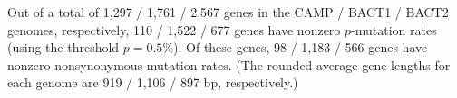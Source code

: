 Out of a total of 1,297 / 1,761 / 2,567 genes in the CAMP / BACT1 / BACT2 genomes, respectively, 110 / 1,522 / 677 genes have nonzero $p$-mutation rates (using the threshold $p=0.5\%$). Of these genes, 98 / 1,183 / 566 genes have nonzero nonsynonymous mutation rates. (The rounded average gene lengths for each genome are 919 / 1,106 / 897 bp, respectively.)\endinput